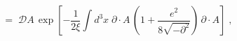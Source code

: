 \begin{equation}
[{\mathcal D}A]\;=\; {\mathcal D}A \, \exp[ - \frac{1}{2 \xi} 
\int d^3x \; \partial\cdot A \,( 1 + \frac{e^2}{8
  \sqrt{-\partial^2}}) \, \partial \cdot A ] \;,
\end{equation}


